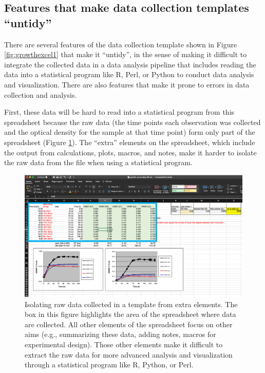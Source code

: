 \documentclass[]{tufte-book}
\begin{document}
\hypertarget{features-that-make-data-collection-templates-untidy}{%
\subsection{Features that make data collection templates ``untidy''}\label{features-that-make-data-collection-templates-untidy}}

There are several features of the data collection template shown in Figure
\ref{fig:growthexcel1} that make it ``untidy'', in the sense of making it
difficult to integrate the collected data in a data analysis pipeline that
includes reading the data into a statistical program like R, Perl, or Python to
conduct data analysis and visualization. There are also features that make it
prone to errors in data collection and analysis.

First, these data will be hard to read into a statistical program from this
spreadsheet because the raw data (the time points each observation was collected
and the optical density for the sample at that time point) form only part of the
spreadsheet (Figure \ref{fig:extractraw}). The ``extra'' elements on the
spreadsheet, which include the output from calculations, plots, macros, and
notes, make it harder to isolate the raw data from the file when using a
statistical program.

\begin{figure}
\includegraphics[width=\textwidth]{figures/growth_curve_raw_data} \caption[Isolating raw data collected in a template from extra elements]{Isolating raw data collected in a template from extra elements. The box in this figure highlights the area of the spreadsheet where data are collected. All other elements of the spreadsheet focus on other aims (e.g., summarizing these data, adding notes, macros for experimental design). Those other elements make it difficult to extract the raw data for more advanced analysis and visualization through a statistical program like R, Python, or Perl.}\label{fig:extractraw}
\end{figure}
\end{document}
